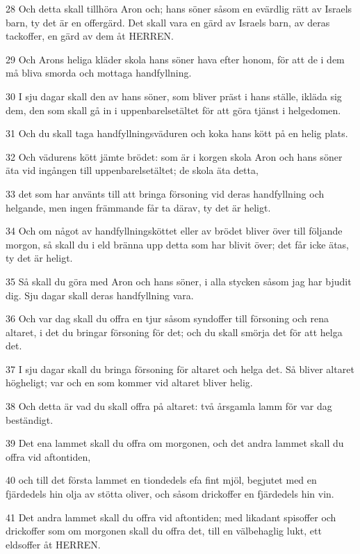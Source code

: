 \par 28 Och detta skall tillhöra Aron och; hans söner såsom en evärdlig rätt av Israels barn, ty det är en offergärd. Det skall vara en gärd av Israels barn, av deras tackoffer, en gärd av dem åt HERREN.
\par 29 Och Arons heliga kläder skola hans söner hava efter honom, för att de i dem må bliva smorda och mottaga handfyllning.
\par 30 I sju dagar skall den av hans söner, som bliver präst i hans ställe, ikläda sig dem, den som skall gå in i uppenbarelsetältet för att göra tjänst i helgedomen.
\par 31 Och du skall taga handfyllningsväduren och koka hans kött på en helig plats.
\par 32 Och vädurens kött jämte brödet: som är i korgen skola Aron och hans söner äta vid ingången till uppenbarelsetältet; de skola äta detta,
\par 33 det som har använts till att bringa försoning vid deras handfyllning och helgande, men ingen främmande får ta därav, ty det är heligt.
\par 34 Och om något av handfyllningsköttet eller av brödet bliver över till följande morgon, så skall du i eld bränna upp detta som har blivit över; det får icke ätas, ty det är heligt.
\par 35 Så skall du göra med Aron och hans söner, i alla stycken såsom jag har bjudit dig. Sju dagar skall deras handfyllning vara.
\par 36 Och var dag skall du offra en tjur såsom syndoffer till försoning och rena altaret, i det du bringar försoning för det; och du skall smörja det för att helga det.
\par 37 I sju dagar skall du bringa försoning för altaret och helga det. Så bliver altaret högheligt; var och en som kommer vid altaret bliver helig.
\par 38 Och detta är vad du skall offra på altaret: två årsgamla lamm för var dag beständigt.
\par 39 Det ena lammet skall du offra om morgonen, och det andra lammet skall du offra vid aftontiden,
\par 40 och till det första lammet en tiondedels efa fint mjöl, begjutet med en fjärdedels hin olja av stötta oliver, och såsom drickoffer en fjärdedels hin vin.
\par 41 Det andra lammet skall du offra vid aftontiden; med likadant spisoffer och drickoffer som om morgonen skall du offra det, till en välbehaglig lukt, ett eldsoffer åt HERREN.
